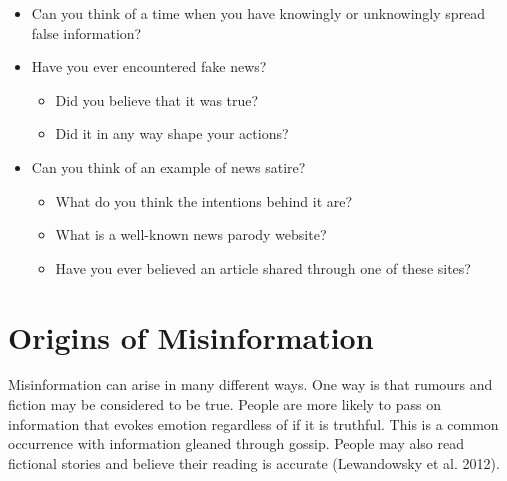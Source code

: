 \documentclass[
  letterpaper,
  DIV=11,
  numbers=noendperiod]{scrreprt}
\providecommand{\tightlist}{%
  \setlength{\itemsep}{0pt}\setlength{\parskip}{0pt}}
\begin{document}
\begin{tcolorbox}[enhanced jigsaw, arc=.35mm, bottomrule=.15mm, bottomtitle=1mm, breakable, colback=white, colbacktitle=quarto-callout-tip-color!10!white, colframe=quarto-callout-tip-color-frame, coltitle=black, left=2mm, leftrule=.75mm, opacityback=0, opacitybacktitle=0.6, rightrule=.15mm, title=\textcolor{quarto-callout-tip-color}{\faLightbulb}\hspace{0.5em}{Pause and Reflect}, titlerule=0mm, toprule=.15mm, toptitle=1mm]

\begin{itemize}
\tightlist
\item
  Can you think of a time when you have knowingly or unknowingly spread
  false information?
\item
  Have you ever encountered fake news?

  \begin{itemize}
  \tightlist
  \item
    Did you believe that it was true?
  \item
    Did it in any way shape your actions?
  \end{itemize}
\item
  Can you think of an example of news satire?

  \begin{itemize}
  \tightlist
  \item
    What do you think the intentions behind it are?
  \item
    What is a well-known news parody website?
  \item
    Have you ever believed an article shared through one of these sites?
  \end{itemize}
\end{itemize}

\end{tcolorbox}

\section{Origins of Misinformation}\label{origins-of-misinformation}

Misinformation can arise in many different ways. One way is that rumours
and fiction may be considered to be true. People are more likely to pass
on information that evokes emotion regardless of if it is truthful. This
is a common occurrence with information gleaned through gossip. People
may also read fictional stories and believe their reading is accurate
(Lewandowsky et al. 2012).
\end{document}

